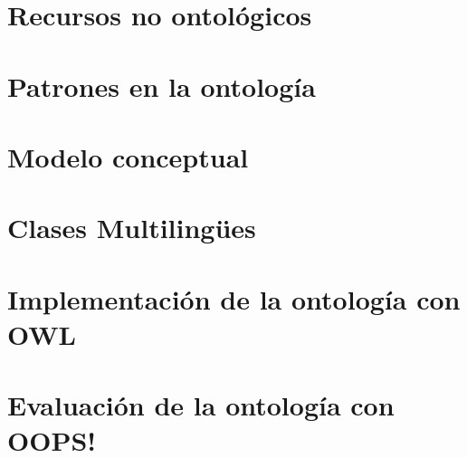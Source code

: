 \documentclass[a4paper,12pt]{article}
\begin{document}
	\section{Recursos no ontológicos}
	
	\section{Patrones en la ontología}
	
	\section{Modelo conceptual}
	
	\section{Clases Multilingües}
	
	\section{Implementación de la ontología con OWL}
	
	\section{Evaluación de la ontología con OOPS!}
	
\end{document}
